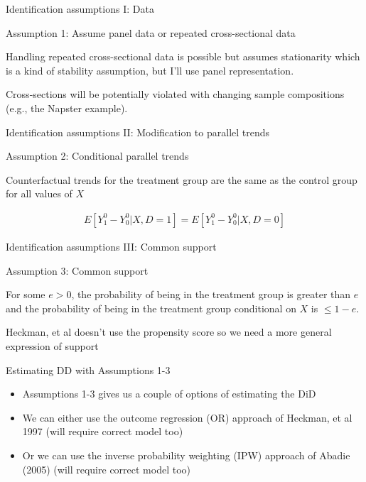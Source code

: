 \documentclass{beamer}
\begin{document}
\begin{frame}{Identification assumptions I: Data}

Assumption 1: Assume panel data or repeated cross-sectional data

\bigskip

Handling repeated cross-sectional data is possible but assumes stationarity which is a kind of stability assumption, but I'll use panel representation. 

\bigskip

Cross-sections will be potentially violated with changing sample compositions (e.g., the Napster example). 

\end{frame}

\begin{frame}{Identification assumptions II: Modification to parallel trends}

Assumption 2: Conditional parallel trends

\bigskip

Counterfactual trends for the treatment group are the same as the control group for all values of $X$

\begin{eqnarray*}
E[Y_1^0 - Y_0^0 | X, D=1] = E[Y^0_1 - Y^0_0 | X, D=0]
\end{eqnarray*}

\end{frame}

\begin{frame}{Identification assumptions III: Common support}

Assumption 3: Common support

\bigskip

For some $e>0$, the probability of being in the treatment group is greater than $e$ and the probability of being in the treatment group conditional on $X$ is $\leq1-e$. 

\bigskip

Heckman, et al doesn't use the propensity score so we need a more general expression of support

\end{frame}

\begin{frame}{Estimating DD with Assumptions 1-3}

\begin{itemize}
\item Assumptions 1-3 gives us a couple of options of estimating the DiD
\item We can either use the outcome regression (OR) approach of Heckman, et al 1997 (will require correct model too)
\item Or we can use the inverse probability weighting (IPW) approach of Abadie (2005) (will require correct model too)
\end{itemize}

\end{frame}
\end{document}
